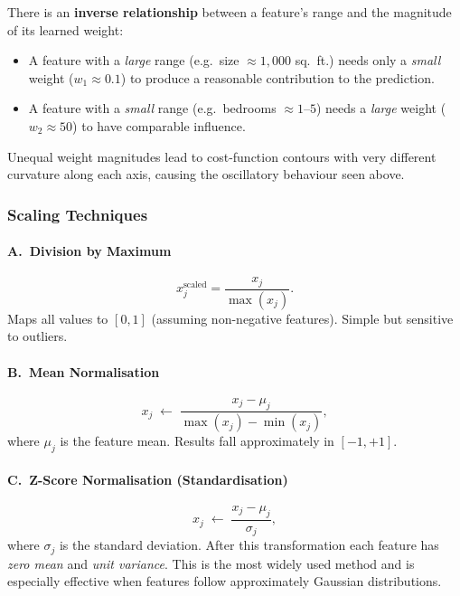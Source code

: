 There is an \textbf{inverse relationship} between a feature's range and the
magnitude of its learned weight:
\begin{itemize}
\item A feature with a \emph{large} range (e.g.\ size $\approx 1{,}000$
  sq.\ ft.) needs only a \emph{small} weight ($w_1\approx 0.1$) to produce
  a reasonable contribution to the prediction.
\item A feature with a \emph{small} range (e.g.\ bedrooms $\approx 1$--$5$)
  needs a \emph{large} weight ($w_2\approx 50$) to have comparable influence.
\end{itemize}
Unequal weight magnitudes lead to cost-function contours with very different
curvature along each axis, causing the oscillatory behaviour seen above.

\subsubsection{Scaling Techniques}

\paragraph{A.\ Division by Maximum}
\begin{equation}
x_j^{\text{scaled}}=\frac{x_j}{\max(x_j)}.
\end{equation}
Maps all values to $[0,1]$ (assuming non-negative features). Simple but
sensitive to outliers.

\paragraph{B.\ Mean Normalisation}
\begin{equation}
x_j\;\leftarrow\;\frac{x_j-\mu_j}{\max(x_j)-\min(x_j)},
\end{equation}
where $\mu_j$ is the feature mean. Results fall approximately in $[-1,+1]$.

\paragraph{C.\ Z-Score Normalisation (Standardisation)}
\begin{equation}
x_j\;\leftarrow\;\frac{x_j-\mu_j}{\sigma_j},
\label{eq:zscore}
\end{equation}
where $\sigma_j$ is the standard deviation. After this transformation each
feature has \emph{zero mean} and \emph{unit variance}. This is the most widely
used method and is especially effective when features follow approximately
Gaussian distributions.

